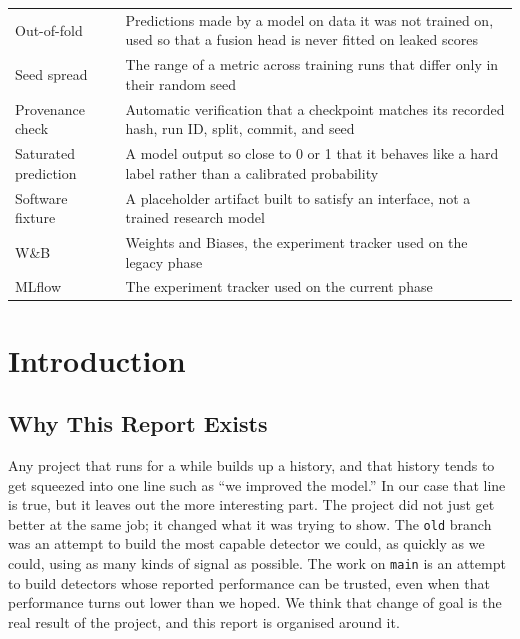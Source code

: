 \begin{tabularx}{\textwidth}{@{}>{\raggedright\arraybackslash}p{3.8cm}X@{}}
    Out-of-fold        & Predictions made by a model on data it was not trained on, used so that a fusion head is never fitted on leaked scores \\
    Seed spread        & The range of a metric across training runs that differ only in their random seed \\
    Provenance check   & Automatic verification that a checkpoint matches its recorded hash, run ID, split, commit, and seed \\
    Saturated prediction & A model output so close to 0 or 1 that it behaves like a hard label rather than a calibrated probability \\
    Software fixture   & A placeholder artifact built to satisfy an interface, not a trained research model \\
    W\&B               & Weights and Biases, the experiment tracker used on the legacy phase \\
    MLflow             & The experiment tracker used on the current phase \\
    \bottomrule
\end{tabularx}

\clearpage

\setcounter{page}{1}

\chapter{Introduction}
\label{ch:introduction}

\section{Why This Report Exists}

Any project that runs for a while builds up a history, and that history tends
to get squeezed into one line such as ``we improved the model.'' In our case
that line is true, but it leaves out the more interesting part. The project
did not just get better at the same job; it changed what it was trying to
show. The \texttt{old} branch was an attempt to build the most capable detector
we could, as quickly as we could, using as many kinds of signal as possible.
The work on \texttt{main} is an attempt to build detectors whose reported
performance can be trusted, even when that performance turns out lower than we
hoped. We think that change of goal is the real result of the project, and this
report is organised around it.

